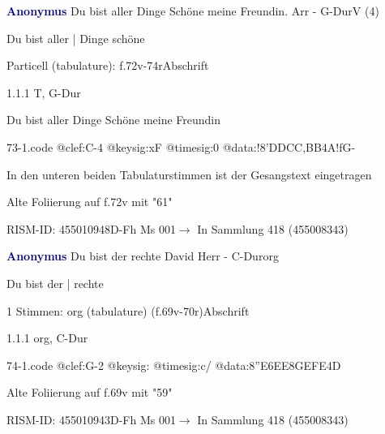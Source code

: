 \documentclass[twocolumn, 12pt]{book}
\begin{document}
\par \vspace{16pt} \textcolor{darkblue}{\textbf{Anonymus  }}\hfillplus{\textbf{[73]}}\newline Du bist aller Dinge Schöne meine Freundin. Arr - G-Dur\newline V (4)
\par \begin{itshape}[f.72v, at left:] Du bist aller | Dinge schöne\end{itshape} 
\par \textcolor{darkblue}{}  Particell (tabulature): f.72v-74r\newline Abschrift
\par 1.1.1  T, G-Dur\newline \begin{footnotesize} Du bist aller Dinge Schöne meine Freundin \end{footnotesize}  
\begin{filecontents*}{73-1.code}
@clef:C-4
@keysig:xF
@timesig:0
@data:!{8'DDCC}{,BB}4A!fG-
\end{filecontents*}
\newline %
\par In den unteren beiden Tabulaturstimmen ist der Gesangstext eingetragen
\par Alte Foliierung auf f.72v mit "61"
\par RISM-ID: 455010948\newline D-Fh  Ms 001\newline $\rightarrow$ In Sammlung 418 (455008343)
      
\par \vspace{16pt} \textcolor{darkblue}{\textbf{Anonymus  }}\hfillplus{\textbf{[74]}}\newline Du bist der rechte David Herr - C-Dur\newline org
\par \begin{itshape}[f.69v, at left:] Du bist der | rechte\end{itshape} 
\par \textcolor{darkblue}{}  1 Stimmen: org (tabulature)  (f.69v-70r)\newline Abschrift
\par 1.1.1  org, C-Dur  
\begin{filecontents*}{74-1.code}
@clef:G-2
@keysig:
@timesig:c/
@data:{8''E6EE8GE}{FE}4D
\end{filecontents*}
\newline %
\par Alte Foliierung auf f.69v mit "59"
\par RISM-ID: 455010943\newline D-Fh  Ms 001\newline $\rightarrow$ In Sammlung 418 (455008343)
      
\end{document}
